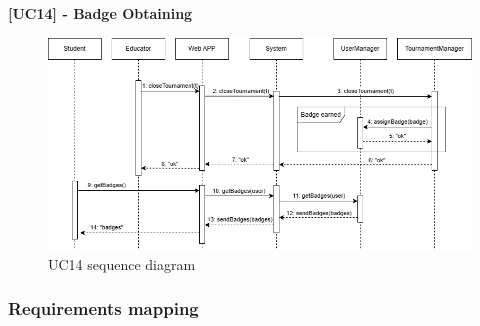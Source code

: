\textbf{[UC14] - Badge Obtaining}
\begin{figure}[H]
    \centering
    \includegraphics[width=1\linewidth]{Images/SD_BadgeAssignment.png}
    \caption{UC14 sequence diagram}
    \label{fig:uc14}
\end{figure}

\newpage

\subsubsection{Requirements mapping}

